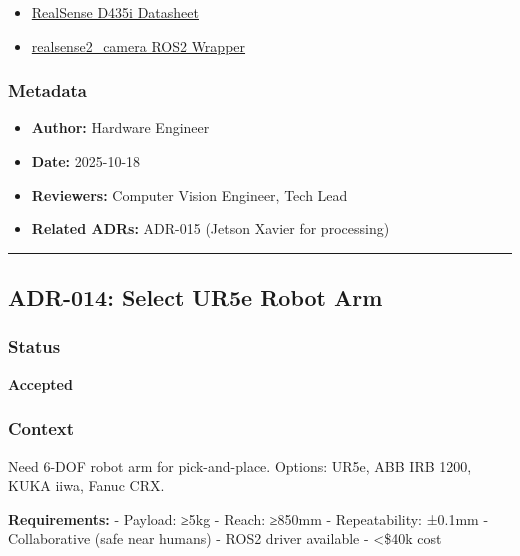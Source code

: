 \documentclass[
]{article}
\providecommand{\tightlist}{%
  \setlength{\itemsep}{0pt}\setlength{\parskip}{0pt}}
\begin{document}
\begin{itemize}
\tightlist
\item
  \href{https://www.intelrealsense.com/depth-camera-d435i/}{RealSense
  D435i Datasheet}
\item
  \href{https://github.com/IntelRealSense/realsense-ros}{realsense2\_camera
  ROS2 Wrapper}
\end{itemize}

\hypertarget{metadata-12}{%
\subsubsection{Metadata}\label{metadata-12}}

\begin{itemize}
\tightlist
\item
  \textbf{Author:} Hardware Engineer
\item
  \textbf{Date:} 2025-10-18
\item
  \textbf{Reviewers:} Computer Vision Engineer, Tech Lead
\item
  \textbf{Related ADRs:} ADR-015 (Jetson Xavier for processing)
\end{itemize}

\begin{center}\rule{0.5\linewidth}{0.5pt}\end{center}

\hypertarget{adr-014-select-ur5e-robot-arm}{%
\subsection{ADR-014: Select UR5e Robot
Arm}\label{adr-014-select-ur5e-robot-arm}}

\hypertarget{status-13}{%
\subsubsection{Status}\label{status-13}}

\textbf{Accepted}

\hypertarget{context-13}{%
\subsubsection{Context}\label{context-13}}

Need 6-DOF robot arm for pick-and-place. Options: UR5e, ABB IRB 1200,
KUKA iiwa, Fanuc CRX.

\textbf{Requirements:} - Payload: ≥5kg - Reach: ≥850mm - Repeatability:
±0.1mm - Collaborative (safe near humans) - ROS2 driver available -
\textless\$40k cost
\end{document}
